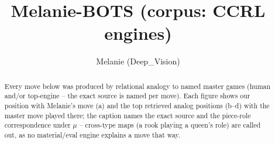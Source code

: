 \documentclass[11pt]{article}
\title{Melanie-BOTS (corpus: CCRL engines)}
\author{Melanie (Deep\_Vision)}
\date{}
\begin{document}
\maketitle

\begin{abstract}Every move below was produced by relational analogy to named master games (human and/or top-engine -- the exact source is named per move). Each figure shows our position with Melanie's move (a) and the top retrieved analog positions (b--d) with the master move played there; the caption names the exact source and the piece-role correspondence under $\mu$ -- cross-type maps (a rook playing a queen's role) are called out, as no material/eval engine explains a move that way.\end{abstract}

\begin{figure}[p]\centering
\begin{subfigure}{0.46\textwidth}\centering
\resizebox{\linewidth}{!}{%
\newchessgame
\chessboard[
  setfen={r1bq1rk1/pppp1ppp/3n1b2/8/3P4/8/PPP2PPP/RNBQRBK1 b - - 2 10},
  showmover=false,
  pgfstyle=straightmove, color=movearrow, markmove={f8-e8}
]}
\caption{}
\end{subfigure}\hfill
\begin{subfigure}{0.46\textwidth}\centering
\resizebox{\linewidth}{!}{%
\newchessgame
\chessboard[
  setfen={r1bq1rk1/pppp1ppp/3n1b2/8/3P4/8/PPP2PPP/RNBQRBK1 b - - 2 10},
  showmover=false,
  pgfstyle=straightmove, color=movearrow, markmove={f8-e8}
]}
\caption{}
\end{subfigure}
\\[4pt]
\begin{subfigure}{0.46\textwidth}\centering
\resizebox{\linewidth}{!}{%
\newchessgame
\chessboard[
  setfen={r1bq1rk1/pppp1ppp/3n1b2/8/3P4/8/PPP2PPP/RNBQRBK1 b - - 2 10},
  showmover=false,
  pgfstyle=straightmove, color=movearrow, markmove={f8-e8}
]}
\caption{}
\end{subfigure}\hfill
\begin{subfigure}{0.46\textwidth}\centering
\resizebox{\linewidth}{!}{%
\newchessgame
\chessboard[
  setfen={r1bq1rk1/pppp1ppp/3n1b2/8/3P4/8/PPP2PPP/RNBQRBK1 b - - 2 10},
  showmover=false,
  pgfstyle=straightmove, color=movearrow, markmove={f8-e8}
]}
\caption{}
\end{subfigure}

\end{figure}
\end{document}
